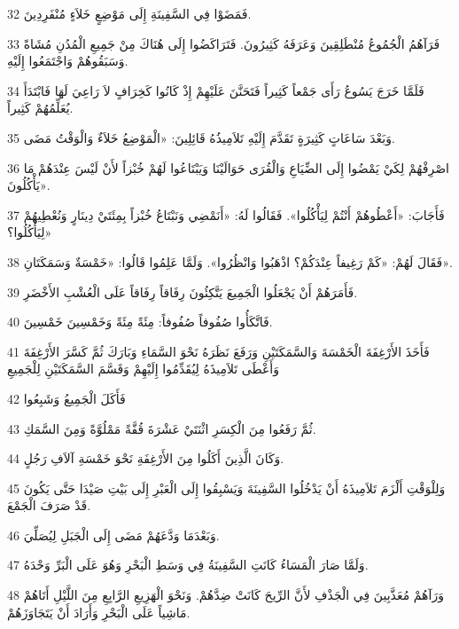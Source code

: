 \par 32 فَمَضَوْا فِي السَّفِينَةِ إِلَى مَوْضِعٍ خَلاَءٍ مُنْفَرِدِينَ.
\par 33 فَرَآهُمُ الْجُمُوعُ مُنْطَلِقِينَ وَعَرَفَهُ كَثِيرُونَ. فَتَرَاكَضُوا إِلَى هُنَاكَ مِنْ جَمِيعِ الْمُدُنِ مُشَاةً وَسَبَقُوهُمْ وَاجْتَمَعُوا إِلَيْهِ.
\par 34 فَلَمَّا خَرَجَ يَسُوعُ رَأَى جَمْعاً كَثِيراً فَتَحَنَّنَ عَلَيْهِمْ إِذْ كَانُوا كَخِرَافٍ لاَ رَاعِيَ لَهَا فَابْتَدَأَ يُعَلِّمُهُمْ كَثِيراً.
\par 35 وَبَعْدَ سَاعَاتٍ كَثِيرَةٍ تَقَدَّمَ إِلَيْهِ تَلاَمِيذُهُ قَائِلِينَ: «الْمَوْضِعُ خَلاَءٌ وَالْوَقْتُ مَضَى.
\par 36 اصْرِفْهُمْ لِكَيْ يَمْضُوا إِلَى الضِّيَاعِ وَالْقُرَى حَوَالَيْنَا وَيَبْتَاعُوا لَهُمْ خُبْزاً لأَنْ لَيْسَ عِنْدَهُمْ مَا يَأْكُلُونَ».
\par 37 فَأَجَابَ: «أَعْطُوهُمْ أَنْتُمْ لِيَأْكُلُوا». فَقَالُوا لَهُ: «أَنَمْضِي وَنَبْتَاعُ خُبْزاً بِمِئَتَيْ دِينَارٍ وَنُعْطِيهُمْ لِيَأْكُلُوا؟»
\par 38 فَقَالَ لَهُمْ: «كَمْ رَغِيفاً عِنْدَكُمْ؟ اذْهَبُوا وَانْظُرُوا». وَلَمَّا عَلِمُوا قَالُوا: «خَمْسَةٌ وَسَمَكَتَانِ».
\par 39 فَأَمَرَهُمْ أَنْ يَجْعَلُوا الْجَمِيعَ يَتَّكِئُونَ رِفَاقاً رِفَاقاً عَلَى الْعُشْبِ الأَخْضَرِ.
\par 40 فَاتَّكَأُوا صُفُوفاً صُفُوفاً: مِئَةً مِئَةً وَخَمْسِينَ خَمْسِينَ.
\par 41 فَأَخَذَ الأَرْغِفَةَ الْخَمْسَةَ وَالسَّمَكَتَيْنِ وَرَفَعَ نَظَرَهُ نَحْوَ السَّمَاءِ وَبَارَكَ ثُمَّ كَسَّرَ الأَرْغِفَةَ وَأَعْطَى تَلاَمِيذَهُ لِيُقَدِّمُوا إِلَيْهِمْ وَقَسَّمَ السَّمَكَتَيْنِ لِلْجَمِيعِ
\par 42 فَأَكَلَ الْجَمِيعُ وَشَبِعُوا
\par 43 ثُمَّ رَفَعُوا مِنَ الْكِسَرِ اثْنَتَيْ عَشْرَةَ قُفَّةً مَمْلُوَّةً وَمِنَ السَّمَكِ.
\par 44 وَكَانَ الَّذِينَ أَكَلُوا مِنَ الأَرْغِفَةِ نَحْوَ خَمْسَةِ آلاَفِ رَجُلٍ.
\par 45 وَلِلْوَقْتِ أَلْزَمَ تَلاَمِيذَهُ أَنْ يَدْخُلُوا السَّفِينَةَ وَيَسْبِقُوا إِلَى الْعَبْرِ إِلَى بَيْتِ صَيْدَا حَتَّى يَكُونَ قَدْ صَرَفَ الْجَمْعَ.
\par 46 وَبَعْدَمَا وَدَّعَهُمْ مَضَى إِلَى الْجَبَلِ لِيُصَلِّيَ.
\par 47 وَلَمَّا صَارَ الْمَسَاءُ كَانَتِ السَّفِينَةُ فِي وَسَطِ الْبَحْرِ وَهُوَ عَلَى الْبَرِّ وَحْدَهُ.
\par 48 وَرَآهُمْ مُعَذَّبِينَ فِي الْجَذْفِ لأَنَّ الرِّيحَ كَانَتْ ضِدَّهُمْ. وَنَحْوَ الْهَزِيعِ الرَّابِعِ مِنَ اللَّيْلِ أَتَاهُمْ مَاشِياً عَلَى الْبَحْرِ وَأَرَادَ أَنْ يَتَجَاوَزَهُمْ.
